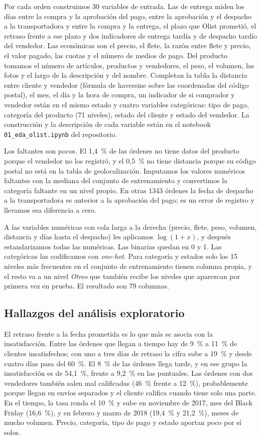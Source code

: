 \documentclass[journal]{IEEEtran}
\begin{document}
Por cada orden construimos 30 variables de entrada. Las de entrega miden los días entre la compra y la aprobación del pago, entre la aprobación y el despacho a la transportadora y entre la compra y la entrega, el plazo que Olist prometió, el retraso frente a ese plazo y dos indicadores de entrega tardía y de despacho tardío del vendedor. Las económicas son el precio, el flete, la razón entre flete y precio, el valor pagado, las cuotas y el número de medios de pago. Del producto tomamos el número de artículos, productos y vendedores, el peso, el volumen, las fotos y el largo de la descripción y del nombre. Completan la tabla la distancia entre cliente y vendedor (fórmula de haversine sobre las coordenadas del código postal), el mes, el día y la hora de compra, un indicador de si comprador y vendedor están en el mismo estado y cuatro variables categóricas: tipo de pago, categoría del producto (71 niveles), estado del cliente y estado del vendedor. La construcción y la descripción de cada variable están en el notebook \texttt{01\_eda\_olist.ipynb} del repositorio.

Los faltantes son pocos. El 1,4~\% de las órdenes no tiene datos del producto porque el vendedor no los registró, y el 0,5~\% no tiene distancia porque su código postal no está en la tabla de geolocalización. Imputamos los valores numéricos faltantes con la mediana del conjunto de entrenamiento y convertimos la categoría faltante en un nivel propio. En otras \num{1343} órdenes la fecha de despacho a la transportadora es anterior a la aprobación del pago; es un error de registro y llevamos esa diferencia a cero.

A las variables numéricas con cola larga a la derecha (precio, flete, peso, volumen, distancia y días hasta el despacho) les aplicamos $\log(1+x)$, y después estandarizamos todas las numéricas. Las binarias quedan en 0 y 1. Las categóricas las codificamos con \emph{one-hot}. Para categoría y estados solo los 15 niveles más frecuentes en el conjunto de entrenamiento tienen columna propia, y el resto va a un nivel \emph{Otros} que también recibe los niveles que aparezcan por primera vez en prueba. El resultado son 79 columnas.

\subsection{Hallazgos del análisis exploratorio}

El retraso frente a la fecha prometida es lo que más se asocia con la insatisfacción. Entre las órdenes que llegan a tiempo hay de 9~\% a 11~\% de clientes insatisfechos; con uno a tres días de retraso la cifra sube a 19~\% y desde cuatro días pasa del 60~\%. El 8~\% de las órdenes llega tarde, y en ese grupo la insatisfacción es de 54,1~\%, frente a 9,2~\% en las puntuales. Las órdenes con dos vendedores también salen mal calificadas (46~\% frente a 12~\%), probablemente porque llegan en envíos separados y el cliente califica cuando tiene solo una parte. En el tiempo, la tasa ronda el 10~\% y sube en noviembre de 2017, mes del Black Friday (16,6~\%), y en febrero y marzo de 2018 (19,4~\% y 21,2~\%), meses de mucho volumen. Precio, categoría, tipo de pago y estado aportan poco por sí solos.
\end{document}
